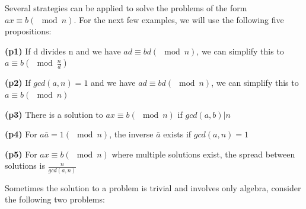 \documentclass{article}
\begin{document}
\par\noindent Several strategies can be applied to solve the problems of the form \(ax \equiv b (\mod n)\). For the next few examples, we will use the following five propositions:
\newline
\newline
\par\noindent \textbf{(p1)} If d divides n and we have \(ad \equiv bd (\mod n)\), we can simplify this to \(a \equiv b (\mod \frac{n}{d})\)
\newline
\par\noindent \textbf{(p2)} If \(gcd(a,n) = 1\) and we have \(ad \equiv bd (\mod n)\), we can simplify this to \(a \equiv b (\mod n)\)
\newline
\par\noindent \textbf{(p3)} There is a solution to \(ax \equiv b (\mod n)\) if \(gcd(a,b) | n\)
\newline
\par\noindent \textbf{(p4)} For \(a\bar{a} = 1 (\mod n)\), the inverse \(\bar{a}\) exists if \(gcd(a,n) = 1\)
\newline
\par\noindent \textbf{(p5)} For \(ax \equiv b (\mod n)\) where multiple solutions exist, the spread between solutions is \(\frac{n}{gcd(a,n)}\)
\newline
\newline
\par\noindent Sometimes the solution to a problem is trivial and involves only algebra, consider the following two problems:
\newline

\newline
\newline
\end{document}
